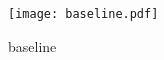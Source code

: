 \begin{answer}
\begin{figure}[H]
    \centering
    \texttt{[image: baseline.pdf]}
    \caption{baseline}
    \label{fig:enter-label}
\end{figure}
\end{answer}
   
  
